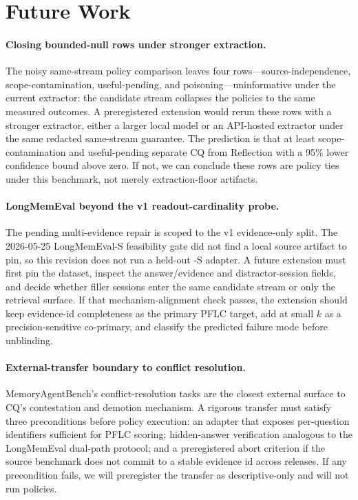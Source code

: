 \section{Future Work}

\paragraph{Closing bounded-null rows under stronger extraction.}
The noisy same-stream policy comparison leaves four rows---source-independence,
scope-contamination, useful-pending, and poisoning---uninformative under the
current extractor: the candidate stream collapses the policies to the same
measured outcomes. A preregistered extension would rerun these rows with a
stronger extractor, either a larger local model or an API-hosted extractor under
the same redacted same-stream guarantee. The prediction is that at
least scope-contamination and useful-pending separate CQ from Reflection
with a 95\% lower confidence bound above zero. If not, we can conclude these
rows are policy ties under this benchmark, not merely extraction-floor
artifacts.

\paragraph{LongMemEval beyond the v1 readout-cardinality probe.}
The pending multi-evidence repair is scoped to the v1 evidence-only split.
The 2026-05-25 LongMemEval-S feasibility gate did not find a local source
artifact to pin, so this revision does not run a held-out -S adapter. A future
extension must first pin the dataset, inspect the answer/evidence and
distractor-session fields, and decide whether filler sessions enter the same
candidate stream or only the retrieval surface. If that mechanism-alignment
check passes, the extension should keep evidence-id completeness as the
primary PFLC target, add  at small \(k\) as a
precision-sensitive co-primary, and classify the predicted failure mode before
unblinding.

\paragraph{External-transfer boundary to conflict resolution.}
MemoryAgentBench's conflict-resolution tasks are the closest external surface
to CQ's contestation and demotion mechanism. A rigorous transfer must satisfy
three preconditions before policy execution: an adapter that exposes
per-question identifiers sufficient for PFLC scoring; hidden-answer
verification analogous to the LongMemEval dual-path protocol; and a
preregistered abort criterion if the source benchmark does
not commit to a stable evidence id across releases. If any precondition fails,
we will preregister the transfer as descriptive-only and will not run policies.

